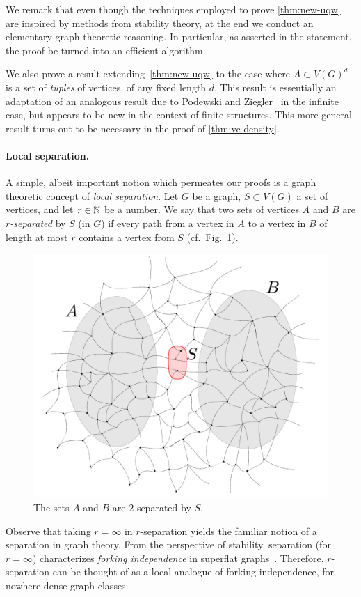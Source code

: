 We remark
that even though the techniques employed to prove \cref{thm:new-uqw} are inspired by methods from stability theory, 
at the end we conduct an elementary graph theoretic reasoning. In particular, as asserted in the statement, the
proof be turned into an efficient algorithm.

We also prove a result extending~\cref{thm:new-uqw}
to the case where $A\subset V(G)^d$ is a set of \emph{tuples} of vertices, of any fixed length $d$.
This result is essentially an adaptation of an analogous result due to Podewski and Ziegler~\cite{podewski1978stable} in the infinite case,
but appears to be new in the context of finite structures.
This more general result turns out to be necessary in the proof of \cref{thm:vc-density}.

\paragraph{Local separation.}
A simple, albeit important notion which permeates our proofs
is a graph theoretic concept of \emph{local separation}.
Let $G$ be a graph, $S\subset V(G)$ a set of vertices,
and let $r\in \mathbb{N}$ be a number. We say that two  sets of vertices $A$ and $B$  are \emph{$r$-separated} by $S$ (in $G$) if every path from a vertex in $A$ to a vertex in $B$
of length at most $r$ contains a vertex from $S$ (cf.~Fig.~\ref{fig:sep}).
 \begin{figure}[h!]
 	\centering
 		\includegraphics[scale=0.35,page=1]{pics}
 	\caption{The sets $A$ and $B$ are $2$-separated by $S$.
 	}
 	\label{fig:sep}
 \end{figure}
Observe that taking $r=\infty$ in $r$-separation yields the familiar notion of a separation in graph theory.
From the perspective of stability, separation (for $r=\infty$) characterizes \emph{forking independence} in superflat graphs~\cite{ivanov}. Therefore,
$r$-separation can be thought of as a local analogue of forking independence, for nowhere dense graph classes.

